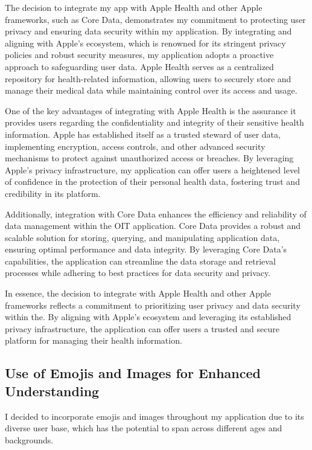 The decision to integrate my app with Apple Health and other Apple frameworks, such as Core Data, demonstrates my commitment to protecting user privacy and ensuring data security within my application. By integrating and aligning with Apple's ecosystem, which is renowned for its stringent privacy policies and robust security measures, my application adopts a proactive approach to safeguarding user data. Apple Health serves as a centralized repository for health-related information, allowing users to securely store and manage their medical data while maintaining control over its access and usage.

One of the key advantages of integrating with Apple Health is the assurance it provides users regarding the confidentiality and integrity of their sensitive health information. Apple has established itself as a trusted steward of user data, implementing encryption, access controls, and other advanced security mechanisms to protect against unauthorized access or breaches. By leveraging Apple's privacy infrastructure, my application can offer users a heightened level of confidence in the protection of their personal health data, fostering trust and credibility in its platform.

Additionally, integration with Core Data enhances the efficiency and reliability of data management within the OIT application. Core Data provides a robust and scalable solution for storing, querying, and manipulating application data, ensuring optimal performance and data integrity. By leveraging Core Data's capabilities, the application can streamline the data storage and retrieval processes while adhering to best practices for data security and privacy.

In essence, the decision to integrate with Apple Health and other Apple frameworks reflects a commitment to prioritizing user privacy and data security within the. By aligning with Apple's ecosystem and leveraging its established privacy infrastructure, the application can offer users a trusted and secure platform for managing their health information.

\subsection{Use of Emojis and Images for Enhanced Understanding}

I decided to incorporate emojis and images throughout my application due to its diverse user base, which has the potential to span across different ages and backgrounds. 

